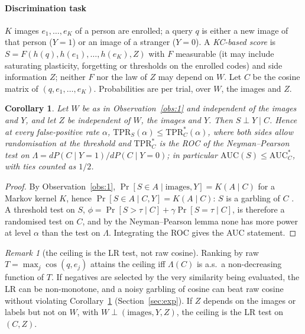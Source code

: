 \documentclass[preprint,12pt,authoryear]{elsarticle}
\newtheorem{corollary}{Corollary}
\theoremstyle{remark}
\newtheorem{remark}{Remark}
\begin{document}
\paragraph{Discrimination task} $K$ images $e_1,\dots,e_K$ of a person are enrolled; a query $q$ is either a new
image of that person ($Y=1$) or an image of a stranger ($Y=0$). A \emph{KC-based score} is
$S=F(h(q),h(e_1),\dots,h(e_K),Z)$ with $F$ measurable (it may include saturating plasticity, forgetting or
thresholds on the enrolled codes) and side information $Z$; neither $F$ nor the law of $Z$ may depend on $W$.
Let $C$ be the cosine matrix of $(q,e_1,\dots,e_K)$. Probabilities are per trial, over $W$, the images and $Z$.

\begin{corollary}\label{cor:1}
Let $W$ be as in Observation~\ref{obs:1} and independent of the images and $Y$, and let $Z$ be independent of
$W$, the images and $Y$. Then $S\perp Y\mid C$. Hence at every false-positive rate $\alpha$,
$\mathrm{TPR}_S(\alpha)\le\mathrm{TPR}^{*}_C(\alpha)$, where both sides allow randomisation at the threshold and
$\mathrm{TPR}^{*}_C$ is the ROC of the Neyman--Pearson test on $\Lambda=dP(C\mid Y{=}1)/dP(C\mid Y{=}0)$; in
particular $\mathrm{AUC}(S)\le\mathrm{AUC}^{*}_C$, with ties counted as $1/2$.
\end{corollary}
\begin{proof}
By Observation~\ref{obs:1}, $\Pr[S\in A\mid\text{images},Y]=K(A\mid C)$ for a Markov kernel $K$, hence
$\Pr[S\in A\mid C,Y]=K(A\mid C)$: $S$ is a garbling of $C$ \citep{blackwell1953}. A threshold test on $S$,
$\phi=\Pr[S>\tau\mid C]+\gamma\Pr[S=\tau\mid C]$, is therefore a randomised test on $C$, and by the
Neyman--Pearson lemma \citep{neyman1933} none has more power at level $\alpha$ than the test on $\Lambda$.
Integrating the ROC gives the AUC statement.
\end{proof}

\begin{remark}[the ceiling is the LR test, not raw cosine]\label{rem:lr}
Ranking by raw $T=\max_j\cos(q,e_j)$ attains the ceiling iff $\Lambda(C)$ is a.s.\ a non-decreasing function of
$T$. If negatives are selected by the very similarity being evaluated, the LR can be non-monotone, and a noisy
garbling of cosine can beat raw cosine without violating Corollary~\ref{cor:1} (Section~\ref{sec:exp}). If $Z$
depends on the images or labels but not on $W$, with $W\perp(\text{images},Y,Z)$, the ceiling is the LR test on
$(C,Z)$.
\end{remark}
\end{document}
